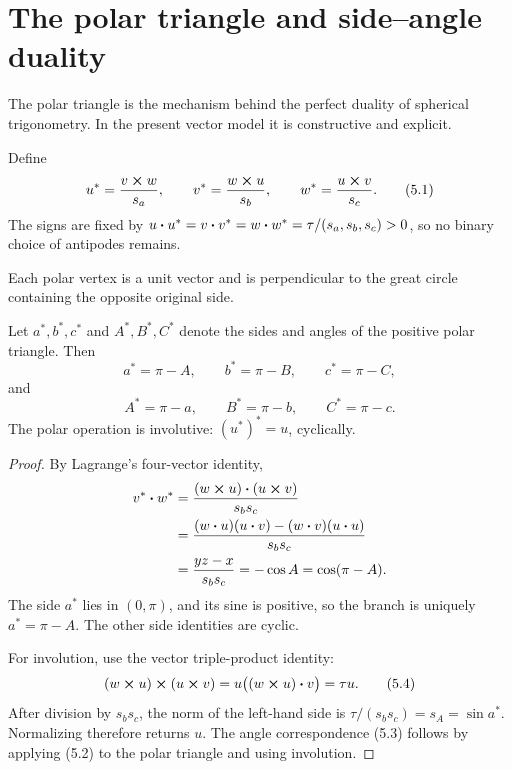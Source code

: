 \section{The polar triangle and side--angle duality}
\label{sec:polar}

The polar triangle is the mechanism behind the perfect duality of spherical
trigonometry.  In the present vector model it is constructive and explicit.

\begin{definition}
Define
\begin{equation}
 u^*=\frac{v\mathbin{\boldsymbol{\times}} w}{s_a},\qquad
 v^*=\frac{w\mathbin{\boldsymbol{\times}} u}{s_b},\qquad
 w^*=\frac{u\mathbin{\boldsymbol{\times}} v}{s_c}.                               \tag{5.1}
\end{equation}
The signs are fixed by
\(u\mathbin{\boldsymbol{\cdot}} u^*=v\mathbin{\boldsymbol{\cdot}} v^*=w\mathbin{\boldsymbol{\cdot}} w^*=\tau/(s_a,s_b,s_c)>0\),
so no binary choice of antipodes remains.
\end{definition}

Each polar vertex is a unit vector and is perpendicular to the great circle
containing the opposite original side.

\begin{theorem}
\label{thm:polar-correspondence}
Let \(a^*,b^*,c^*\) and \(A^*,B^*,C^*\) denote the sides and angles of the
positive polar triangle.  Then
\begin{equation}
 a^*=\pi-A,
 \qquad b^*=\pi-B,
 \qquad c^*=\pi-C,                                         \tag{5.2}
\end{equation}
and
\begin{equation}
 A^*=\pi-a,
 \qquad B^*=\pi-b,
 \qquad C^*=\pi-c.                                         \tag{5.3}
\end{equation}
The polar operation is involutive: \((u^*)^*=u\), cyclically.
\end{theorem}

\begin{proof}
By Lagrange's four-vector identity,
\begin{align*}
 v^*\mathbin{\boldsymbol{\cdot}} w^*
 &=\frac{(w\mathbin{\boldsymbol{\times}} u)\mathbin{\boldsymbol{\cdot}}(u\mathbin{\boldsymbol{\times}} v)}{s_bs_c}\\
 &=\frac{(w\mathbin{\boldsymbol{\cdot}} u)(u\mathbin{\boldsymbol{\cdot}} v)-(w\mathbin{\boldsymbol{\cdot}} v)(u\mathbin{\boldsymbol{\cdot}} u)}{s_bs_c}\\
 &=\frac{yz-x}{s_bs_c}=-\cos A=\cos(\pi-A).
\end{align*}
The side \(a^*\) lies in \((0,\pi)\), and its sine is positive, so the branch is
uniquely \(a^*=\pi-A\).  The other side identities are cyclic.

For involution, use the vector triple-product identity:
\begin{equation}
 (w\mathbin{\boldsymbol{\times}} u)\mathbin{\boldsymbol{\times}}(u\mathbin{\boldsymbol{\times}} v)
 =u\bigl((w\mathbin{\boldsymbol{\times}} u)\mathbin{\boldsymbol{\cdot}} v\bigr)=\tau u.                 \tag{5.4}
\end{equation}
After division by \(s_bs_c\), the norm of the left-hand side is
\(\tau/(s_bs_c)=s_A=\sin a^*\).  Normalizing therefore returns \(u\).
The angle correspondence (5.3) follows by applying (5.2) to the polar triangle
and using involution.
\end{proof}

